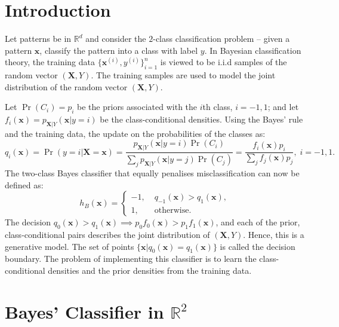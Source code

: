 \documentclass[11pt, a4 paper]{article}
\newcommand{\bx}{\mathbf{x}}
\newcommand{\bX}{\mathbf{X}}
\newcommand{\rr}{\mathbb{R}}
\begin{document}




\section*{Introduction}
\label{sec:intro}

Let patterns be in $\rr^d$ and consider the $2$-class classification problem -- given a pattern $\bx$, classify the pattern into a class with label $y$. In Bayesian classification theory, the training data $\{\bx^{(i)}, y^{(i)}\}_{i=1}^n$ is viewed to be i.i.d samples of the random vector $(\bX, Y)$. The training samples are used to model the joint distribution of the random vector $(\bX, Y)$.

Let $\Pr(C_i) = p_i$ be the priors associated with the $i$th class, $i=-1,1$; and let $f_i(\bx) = p_{\bX\vert Y}(\bx \vert y=i)$ be the class-conditional densities. Using the Bayes' rule and the training data, the update on the probabilities of the classes as:
\begin{equation}
	q_i(\bx) = \Pr(y=i\vert \bX=\bx) = \frac{p_{\bX\vert Y}(\bx \vert y=i)\Pr(C_i)}{\sum_j p_{\bX\vert Y}(\bx \vert y=j)\Pr(C_j)} = \frac{f_i(\bx) p_i}{\sum_j f_j(\bx) p_j}, \; i=-1,1.
\end{equation}
The two-class Bayes classifier that equally penalises misclassification can now be defined as:
\begin{equation}
	h_B(\bx) = \begin{cases}
		-1, &\; q_{-1}(\bx) > q_1(\bx), \\
		1, &\; \mathrm{otherwise}.
	\end{cases}
\label{eq:bayesClassifier}
\end{equation}
The decision $q_0(\bx) > q_1(\bx) \implies p_0 f_0(\bx) > p_1 f_1(\bx)$, and each of the prior, class-conditional pairs describes the joint distribution of $(\bX, Y)$. Hence, this is a generative model. The set of points $\{\bx \vert q_0(\bx) = q_1(\bx)\}$ is called the decision boundary. The problem of implementing this classifier is to learn the class-conditional densities and the prior densities from the training data.


\section{Bayes' Classifier in $\rr^{2}$}
\label{sec:bayes2D}
\end{document}
